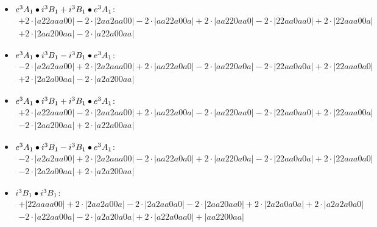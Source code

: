 \documentclass{article}
\begin{document}
\begin{itemize}
$$\begin{array}{c}
\end{array}$$
\item \boldmath$e^3 A_1 \bullet i^3 B_{1} + i^3 B_{1} \bullet e^3 A_1 \displaystyle $\unboldmath : \quad$$\begin{array}{c}
+2 \cdot \left|a22aaa00\right| -2 \cdot \left|2aa2aa00\right| -2 \cdot \left|aa22a00a\right| +2 \cdot \left|aa220aa0\right| -2 \cdot \left|22aa0aa0\right| +2 \cdot \left|22aaa00a\right| \\[0.5cm] +2 \cdot \left|2aa200aa\right| -2 \cdot \left|a22a00aa\right|
\end{array}$$
\item \boldmath$e^3 A_1 \bullet i^3 B_{1} - i^3 B_{1} \bullet e^3 A_1 \displaystyle $\unboldmath : \quad$$\begin{array}{c}
-2 \cdot \left|a2a2aa00\right| +2 \cdot \left|2a2aaa00\right| +2 \cdot \left|aa22a0a0\right| -2 \cdot \left|aa220a0a\right| -2 \cdot \left|22aa0a0a\right| +2 \cdot \left|22aaa0a0\right| \\[0.5cm] +2 \cdot \left|2a2a00aa\right| -2 \cdot \left|a2a200aa\right|
\end{array}$$
\item \boldmath$e^3 A_1 \bullet i^3 B_{1} + i^3 B_{1} \bullet e^3 A_1 \displaystyle $\unboldmath : \quad$$\begin{array}{c}
+2 \cdot \left|a22aaa00\right| -2 \cdot \left|2aa2aa00\right| +2 \cdot \left|aa22a00a\right| -2 \cdot \left|aa220aa0\right| -2 \cdot \left|22aa0aa0\right| +2 \cdot \left|22aaa00a\right| \\[0.5cm] -2 \cdot \left|2aa200aa\right| +2 \cdot \left|a22a00aa\right|
\end{array}$$
\item \boldmath$e^3 A_1 \bullet i^3 B_{1} - i^3 B_{1} \bullet e^3 A_1 \displaystyle $\unboldmath : \quad$$\begin{array}{c}
-2 \cdot \left|a2a2aa00\right| +2 \cdot \left|2a2aaa00\right| -2 \cdot \left|aa22a0a0\right| +2 \cdot \left|aa220a0a\right| -2 \cdot \left|22aa0a0a\right| +2 \cdot \left|22aaa0a0\right| \\[0.5cm] -2 \cdot \left|2a2a00aa\right| +2 \cdot \left|a2a200aa\right|
\end{array}$$
\item \boldmath$i^3 B_{1} \bullet i^3 B_{1} \displaystyle $\unboldmath : \quad$$\begin{array}{c}
+\left|22aaaa00\right| +2 \cdot \left|2aa2a00a\right| -2 \cdot \left|2a2aa0a0\right| -2 \cdot \left|2aa20aa0\right| +2 \cdot \left|2a2a0a0a\right| +2 \cdot \left|a2a2a0a0\right| \\[0.5cm] -2 \cdot \left|a22aa00a\right| -2 \cdot \left|a2a20a0a\right| +2 \cdot \left|a22a0aa0\right| +\left|aa2200aa\right|

\end{array}$$
\end{itemize}
\end{document}
